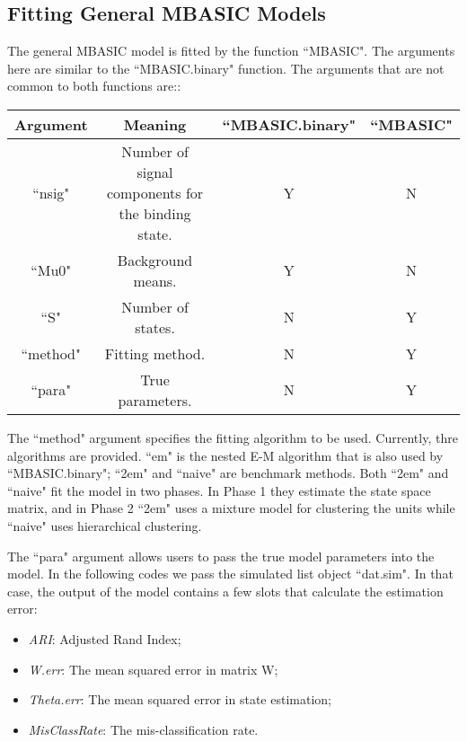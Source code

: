 \documentclass[a4paper,10pt]{article}
\begin{document}
\subsection{Fitting General MBASIC Models}

The general MBASIC model is fitted by the function ``MBASIC". The arguments here are similar to the ``MBASIC.binary" function. The arguments that are not common to both functions are::

\begin{center}
\begin{tabular}{cccc}
  \hline
  Argument & Meaning & ``MBASIC.binary" & ``MBASIC" \\
  \hline
  ``nsig" & Number of signal components for the binding state. & Y & N \\
  ``Mu0" & Background means. & Y & N \\
  ``S" & Number of states. & N & Y \\
  ``method" & Fitting method. & N & Y\\
  ``para" & True parameters. & N & Y \\
  \hline
\end{tabular}
\end{center}
  
The ``method" argument specifies the fitting algorithm to be used. Currently, thre algorithms are provided. ``em" is the nested E-M algorithm that is also used by ``MBASIC.binary"; ``2em" and ``naive" are benchmark methods. Both ``2em" and ``naive" fit the model in two phases. In Phase 1 they estimate the state space matrix, and in Phase 2 ``2em" uses a mixture model for clustering the units while ``naive" uses hierarchical clustering.

The ``para" argument allows users to pass the true model parameters into the model. In the following codes we pass the simulated list object ``dat.sim". In that case, the output of the model contains a few slots that calculate the estimation error:

\begin{itemize}
\item \textit{ARI}: Adjusted Rand Index;
\item \textit{W.err}: The mean squared error in matrix W;
\item \textit{Theta.err}: The mean squared error in state estimation;
\item \textit{MisClassRate}: The mis-classification rate.
\end{itemize}
  
\end{document}
